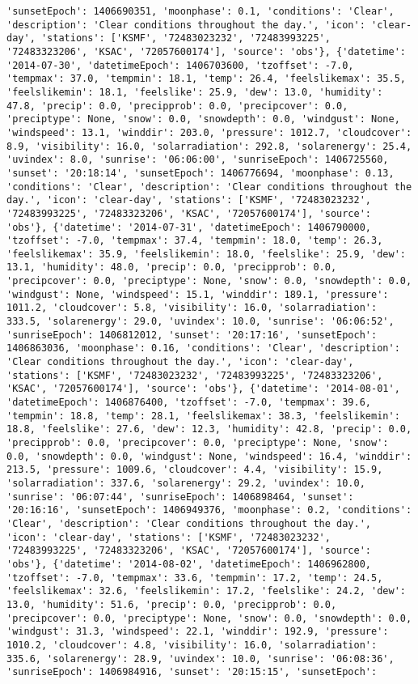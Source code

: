 \documentclass[
  letterpaper,
  DIV=11,
  numbers=noendperiod]{scrartcl}
\begin{document}
\begin{verbatim}
'sunsetEpoch': 1406690351, 'moonphase': 0.1, 'conditions': 'Clear', 'description': 'Clear conditions throughout the day.', 'icon': 'clear-day', 'stations': ['KSMF', '72483023232', '72483993225', '72483323206', 'KSAC', '72057600174'], 'source': 'obs'}, {'datetime': '2014-07-30', 'datetimeEpoch': 1406703600, 'tzoffset': -7.0, 'tempmax': 37.0, 'tempmin': 18.1, 'temp': 26.4, 'feelslikemax': 35.5, 'feelslikemin': 18.1, 'feelslike': 25.9, 'dew': 13.0, 'humidity': 47.8, 'precip': 0.0, 'precipprob': 0.0, 'precipcover': 0.0, 'preciptype': None, 'snow': 0.0, 'snowdepth': 0.0, 'windgust': None, 'windspeed': 13.1, 'winddir': 203.0, 'pressure': 1012.7, 'cloudcover': 8.9, 'visibility': 16.0, 'solarradiation': 292.8, 'solarenergy': 25.4, 'uvindex': 8.0, 'sunrise': '06:06:00', 'sunriseEpoch': 1406725560, 'sunset': '20:18:14', 'sunsetEpoch': 1406776694, 'moonphase': 0.13, 'conditions': 'Clear', 'description': 'Clear conditions throughout the day.', 'icon': 'clear-day', 'stations': ['KSMF', '72483023232', '72483993225', '72483323206', 'KSAC', '72057600174'], 'source': 'obs'}, {'datetime': '2014-07-31', 'datetimeEpoch': 1406790000, 'tzoffset': -7.0, 'tempmax': 37.4, 'tempmin': 18.0, 'temp': 26.3, 'feelslikemax': 35.9, 'feelslikemin': 18.0, 'feelslike': 25.9, 'dew': 13.1, 'humidity': 48.0, 'precip': 0.0, 'precipprob': 0.0, 'precipcover': 0.0, 'preciptype': None, 'snow': 0.0, 'snowdepth': 0.0, 'windgust': None, 'windspeed': 15.1, 'winddir': 189.1, 'pressure': 1011.2, 'cloudcover': 5.8, 'visibility': 16.0, 'solarradiation': 333.5, 'solarenergy': 29.0, 'uvindex': 10.0, 'sunrise': '06:06:52', 'sunriseEpoch': 1406812012, 'sunset': '20:17:16', 'sunsetEpoch': 1406863036, 'moonphase': 0.16, 'conditions': 'Clear', 'description': 'Clear conditions throughout the day.', 'icon': 'clear-day', 'stations': ['KSMF', '72483023232', '72483993225', '72483323206', 'KSAC', '72057600174'], 'source': 'obs'}, {'datetime': '2014-08-01', 'datetimeEpoch': 1406876400, 'tzoffset': -7.0, 'tempmax': 39.6, 'tempmin': 18.8, 'temp': 28.1, 'feelslikemax': 38.3, 'feelslikemin': 18.8, 'feelslike': 27.6, 'dew': 12.3, 'humidity': 42.8, 'precip': 0.0, 'precipprob': 0.0, 'precipcover': 0.0, 'preciptype': None, 'snow': 0.0, 'snowdepth': 0.0, 'windgust': None, 'windspeed': 16.4, 'winddir': 213.5, 'pressure': 1009.6, 'cloudcover': 4.4, 'visibility': 15.9, 'solarradiation': 337.6, 'solarenergy': 29.2, 'uvindex': 10.0, 'sunrise': '06:07:44', 'sunriseEpoch': 1406898464, 'sunset': '20:16:16', 'sunsetEpoch': 1406949376, 'moonphase': 0.2, 'conditions': 'Clear', 'description': 'Clear conditions throughout the day.', 'icon': 'clear-day', 'stations': ['KSMF', '72483023232', '72483993225', '72483323206', 'KSAC', '72057600174'], 'source': 'obs'}, {'datetime': '2014-08-02', 'datetimeEpoch': 1406962800, 'tzoffset': -7.0, 'tempmax': 33.6, 'tempmin': 17.2, 'temp': 24.5, 'feelslikemax': 32.6, 'feelslikemin': 17.2, 'feelslike': 24.2, 'dew': 13.0, 'humidity': 51.6, 'precip': 0.0, 'precipprob': 0.0, 'precipcover': 0.0, 'preciptype': None, 'snow': 0.0, 'snowdepth': 0.0, 'windgust': 31.3, 'windspeed': 22.1, 'winddir': 192.9, 'pressure': 1010.2, 'cloudcover': 4.8, 'visibility': 16.0, 'solarradiation': 335.6, 'solarenergy': 28.9, 'uvindex': 10.0, 'sunrise': '06:08:36', 'sunriseEpoch': 1406984916, 'sunset': '20:15:15', 'sunsetEpoch': 
\end{verbatim}
\end{document}
